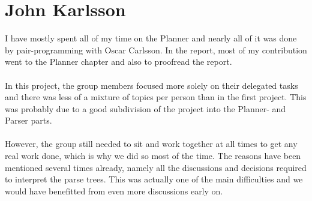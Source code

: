 \section*{John Karlsson}
I have mostly spent all of my time on the Planner and nearly all of it was done
by pair-programming with Oscar Carlsson. In the report, most of my contribution
went to the Planner chapter and also to proofread the report.
\\\\
In this project, the group members focused more solely on their delegated tasks
and there was less of a mixture of topics per person than in the first project.
This was probably due to a good subdivision of the project into the Planner- and
Parser parts.
\\\\
However, the group still needed to sit and work together at all times to get any
real work done, which is why we did so most of the time. The reasons have been
mentioned several times already, namely all the discussions and decisions
required to interpret the parse trees. This was actually one of the main
difficulties and we would have benefitted from even more discussions early on.
